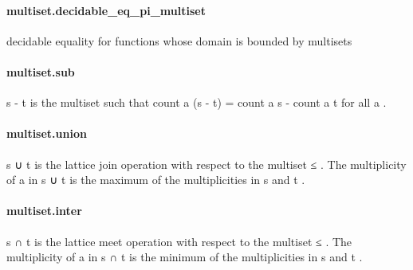 \documentclass{article}
\begin{document}
\paragraph{multiset.decidable\_eq\_pi\_multiset}
\par
decidable equality for functions whose domain is bounded by multisets
\paragraph{multiset.sub}
\par
\colorbox[RGB]{253,246,227}{{{{\color[RGB]{101, 123, 131} s  }}}{{{\color[RGB]{181, 137, 0} - }}}{{{\color[RGB]{101, 123, 131}  t }}}} is the multiset such that
\colorbox[RGB]{253,246,227}{{{{\color[RGB]{101, 123, 131} count a (s  }}}{{{\color[RGB]{181, 137, 0} - }}}{{{\color[RGB]{101, 123, 131}  t)  }}}{{{\color[RGB]{181, 137, 0} = }}}{{{\color[RGB]{101, 123, 131}  count a s  }}}{{{\color[RGB]{181, 137, 0} - }}}{{{\color[RGB]{101, 123, 131}  count a t }}}} for all 
\colorbox[RGB]{253,246,227}{{{{\color[RGB]{101, 123, 131} a }}}}.
\paragraph{multiset.union}
\par
\colorbox[RGB]{253,246,227}{{{{\color[RGB]{101, 123, 131} s ∪ t }}}} is the lattice join operation with respect to the
multiset 
\colorbox[RGB]{253,246,227}{{{{\color[RGB]{181, 137, 0} ≤ }}}}. The multiplicity of 
\colorbox[RGB]{253,246,227}{{{{\color[RGB]{101, 123, 131} a }}}} in 
\colorbox[RGB]{253,246,227}{{{{\color[RGB]{101, 123, 131} s ∪ t }}}} is the maximum
of the multiplicities in 
\colorbox[RGB]{253,246,227}{{{{\color[RGB]{101, 123, 131} s }}}} and 
\colorbox[RGB]{253,246,227}{{{{\color[RGB]{101, 123, 131} t }}}}.
\paragraph{multiset.inter}
\par
\colorbox[RGB]{253,246,227}{{{{\color[RGB]{101, 123, 131} s ∩ t }}}} is the lattice meet operation with respect to the
multiset 
\colorbox[RGB]{253,246,227}{{{{\color[RGB]{181, 137, 0} ≤ }}}}. The multiplicity of 
\colorbox[RGB]{253,246,227}{{{{\color[RGB]{101, 123, 131} a }}}} in 
\colorbox[RGB]{253,246,227}{{{{\color[RGB]{101, 123, 131} s ∩ t }}}} is the minimum
of the multiplicities in 
\colorbox[RGB]{253,246,227}{{{{\color[RGB]{101, 123, 131} s }}}} and 
\colorbox[RGB]{253,246,227}{{{{\color[RGB]{101, 123, 131} t }}}}.
\end{document}
